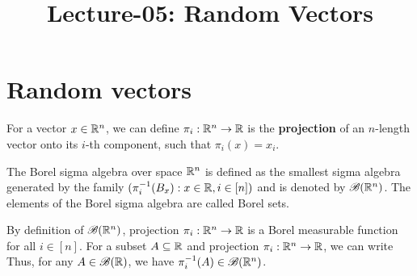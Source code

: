 \documentclass[letterpaper,10pt,english]{article}
\title{Lecture-05: Random Vectors}
\author{}
\begin{document}
\maketitle
\section{Random vectors} 
\begin{defn}[Projection] 
For a vector $x \in \mathbb{R}^n$, we can define $\pi_i: \mathbb{R}^n \to \mathbb{R}$ is the \textbf{projection} of an $n$-length vector onto its $i$-th component, such that $\pi_i(x) = x_i$. 
\end{defn}
\begin{defn}
The Borel sigma algebra over space $\mathbb{R}^n$ is defined as the smallest sigma algebra generated by the family $(\pi_i^{-1}(B_x): x \in \mathbb{R}, i \in [n])$ and is denoted by $\mathscr{B}(\mathbb{R}^n)$. 
The elements of the Borel sigma algebra are called Borel sets. 
\end{defn}
\begin{rem}
By definition of $\mathscr{B}(\mathbb{R}^n)$, projection $\pi_i: \mathbb{R}^n \to \mathbb{R}$ is a Borel measurable function for all $i \in [n]$. 
For a subset $A \subseteq \mathbb{R}$ and projection $\pi_i: \mathbb{R}^n \to \mathbb{R}$, 
we can write 
Thus, for any $A \in \mathscr{B}(\mathbb{R})$, we have $\pi_i^{-1}(A) \in \mathscr{B}(\mathbb{R}^n)$. 
\end{rem}
\end{document}
